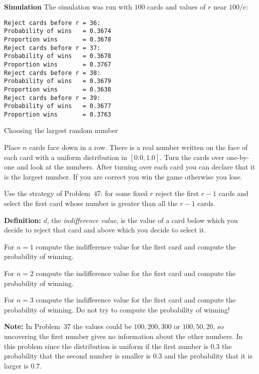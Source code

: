 \textbf{Simulation}
The simulation was run with $100$ cards and values of $r$ near $100/e$:
\begin{verbatim}
Reject cards before r = 36:
Probability of wins   = 0.3674
Proportion wins       = 0.3678
Reject cards before r = 37:
Probability of wins   = 0.3678
Proportion wins       = 0.3767
Reject cards before r = 38:
Probability of wins   = 0.3679
Proportion wins       = 0.3638
Reject cards before r = 39:
Probability of wins   = 0.3677
Proportion wins       = 0.3763
\end{verbatim}


\begin{prob}{Choosing the largest random number}

Place $n$ cards face down in a row. There is a real number  written on the face of each card with a uniform distribution in $[0.0,1.0]$. Turn the cards over one-by-one and look at the numbers. After turning over each card you can declare that it is the largest number. If you are correct you win the game otherwise you lose. 

Use the strategy of Problem~47: for some fixed $r$ reject the first $r-1$ cards and select the first card whose number is greater than all the $r-1$ cards.

\textbf{Definition:} $d$, the \emph{indifference value}, is the value of a card below which you decide to reject that card and above which you decide to select it.

 For $n=1$ compute the indifference value for the first card and compute the probability of winning.

 For $n=2$ compute the indifference value for the first card and compute the probability of winning.

 For $n=3$ compute the indifference value for the first card and compute the probability of winning. Do not try to compute the probability of winning!

\textbf{Note:} In Problem~37 the values could be $100, 200, 300$ or $100, 50, 20$, so uncovering the first number gives no information about the other numbers. In this problem since the distribution is uniform if the first number is $0.3$ the probability that the second number is smaller is $0.3$ and the probability that it is larger is $0.7$.
\end{prob}

\solution{}

